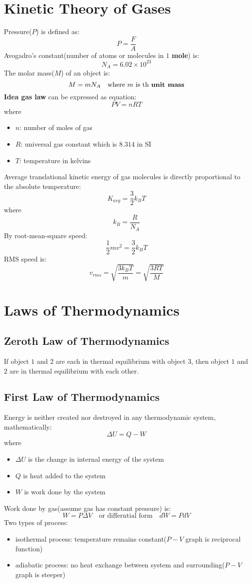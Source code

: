 \documentclass[10pt,a4paper,oneside]{article}
\begin{document}
\section{Kinetic Theory of Gases}
Pressure($P$) is defined as:
\[
P = \frac{F}{A}
\]
Avogadro's constant(number of atoms or molecules in $1$ \textbf{mole}) is:
\[
N_A = 6.02 \times 10^{23}
\]
The molar mass($M$) of an object is:
\[
M = m N_A \quad \text{where $m$ is th \textbf{unit mass}}
\]
\textbf{Idea gas law} can be expressed as equation:
\[
PV = nRT
\]
where
\begin{itemize}
	\item $n$: number of moles of gas
	\item $R$: universal gas constant which is $8.314$ in SI
	\item $T$: temperature in kelvins
\end{itemize}
Average translational kinetic energy of gas molecules is directly proportional to the absolute temperature:
\[
K_{avg} = \frac{3}{2} k_B T
\]
where 
\[
k_B = \frac{R}{N_A}
\]
By root-mean-square speed:
\[
\frac{1}{2}mv^2 = \frac{3}{2} k_B T
\]
RMS speed is:
\[
v_{rms} = \sqrt{\frac{3k_B T}{m}} = \sqrt{\frac{3RT}{M}}
\]

\section{Laws of Thermodynamics}

\subsection{Zeroth Law of Thermodynamics}
If object $1$ and $2$ are each in thermal equilibrium with object $3$, then object $1$ and $2$ are in thermal equilibrium with each other.

\subsection{First Law of Thermodynamics}
Energy is neither created nor destroyed in any thermodynamic system, mathematically:
\[
\Delta U = Q - W
\]
where
\begin{itemize}
	\item $\Delta U$ is the change in internal energy of the system
	\item $Q$ is heat added to the system
	\item $W$ is work done by the system
\end{itemize}
 Work done by gas(assume gas has constant pressure) is:
 \[
 W = P \Delta V \quad \text{or differntial form} \quad dW = PdV
 \]
 Two types of process:
 \begin{itemize}
 	\item isothermal process: temperature remains constant($P-V$ graph is reciprocal function)
 	\item adiabatic process: no heat exchange between system and surrounding($P-V$ graph is steeper)
 \end{itemize}
\end{document}
